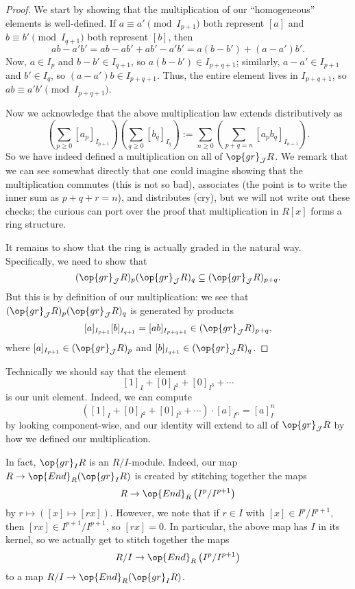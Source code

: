 \begin{proof}
	We start by showing that the multiplication of our ``homogeneous'' elements is well-defined. If $a\equiv a'\pmod{I_{p+1}}$ both represent $[a]$ and $b\equiv b'\pmod{I_{q+1}}$ both represent $[b]$, then
	\[ab-a'b'=ab-ab'+ab'-a'b'=a(b-b')+(a-a')b'.\]
	Now, $a\in I_p$ and $b-b'\in I_{q+1}$, so $a(b-b')\in I_{p+q+1}$; similarly, $a-a'\in I_{p+1}$ and $b'\in I_q$, so $(a-a')b\in I_{p+q+1}$. Thus, the entire element lives in $I_{p+q+1}$, so $ab\equiv a'b'\pmod{I_{p+q+1}}$.
	
	Now we acknowledge that the above multiplication law extends distributively as
	\[\left(\sum_{p\ge0}[a_p]_{I_{p+1}}\right)\left(\sum_{q\ge0}[b_q]_{I_q}\right):=\sum_{n\ge0}\left(\sum_{p+q=n}[a_pb_q]_{I_{n+1}}\right).\]
	So we have indeed defined a multiplication on all of $\op{gr}_\mathcal JR$. We remark that we can see somewhat directly that one could imagine showing that the multiplication commutes (this is not so bad), associates (the point is to write the inner sum as $p+q+r=n$), and distributes (cry), but we will not write out these checks; the curious can port over the proof that multiplication in $R[x]$ forms a ring structure. %

	It remains to show that the ring is actually graded in the natural way. Specifically, we need to show that
	\[(\op{gr}_\mathcal JR)_p(\op{gr}_\mathcal JR)_q\subseteq(\op{gr}_\mathcal JR)_{p+q}.\]
	But this is by definition of our multiplication: we see that $(\op{gr}_\mathcal JR)_p(\op{gr}_\mathcal JR)_q$ is generated by products
	\[[a]_{I_{p+1}}[b]_{I_{q+1}}=[ab]_{I_{p+q+1}}\in(\op{gr}_\mathcal JR)_{p+q},\]
	where $[a]_{I_{p+1}}\in(\op{gr}_\mathcal JR)_p$ and $[b]_{I_{q+1}}\in(\op{gr}_\mathcal JR)_q$.
\end{proof}
\begin{remark}
	Technically we should say that the element
	\[[1]_I+[0]_{I^2}+[0]_{I^3}+\cdots\]
	is our unit element. Indeed, we can compute
	\[([1]_I+[0]_{I^2}+[0]_{I^3}+\cdots)\cdot[a]_{I^n}=[a]_I^n\]
	by looking component-wise, and our identity will extend to all of $\op{gr}_\mathcal JR$ by how we defined our multiplication.
\end{remark}
\begin{remark}[Nir] \label{rem:iadicgradedmodule}
	In fact, $\op{gr}_IR$ is an $R/I$-module. Indeed, our map $R\to\op{End}_R(\op{gr}_IR)$ is created by stitching together the maps
	\[R\to\op{End}_R\left(I^p/I^{p+1}\right)\]
	by $r\mapsto([x]\mapsto[rx])$. However, we note that if $r\in I$ with $[x]\in I^p/I^{p+1}$, then $[rx]\in I^{p+1}/I^{p+1}$, so $[rx]=0$. In particular, the above map has $I$ in its kernel, so we actually get to stitch together the maps
	\[R/I\to\op{End}_R\left(I^p/I^{p+1}\right)\]
	to a map $R/I\to\op{End}_R(\op{gr}_IR)$.
\end{remark}
